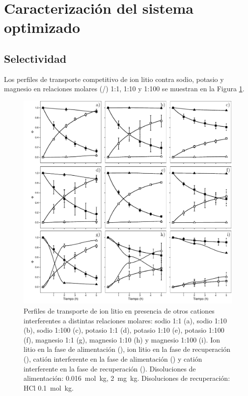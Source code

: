 \section{Caracterización del sistema optimizado}
\subsection{Selectividad}\label{sec:selecresults}
Los perfiles de transporte competitivo de ion litio contra sodio, potasio y magnesio en relaciones molares (/) 1:1, 1:10 y 1:100 se muestran en la Figura \ref{fig:selectivity1}.

\begin{figure}[H]
    \centering
    \includegraphics[width=\textwidth]{chap5/figures/thesis-selectividad.pdf}
    \caption[Perfiles de transporte competitivo de ion litio contra sodio, potasio y magnesio.]{Perfiles de transporte de ion litio en presencia de otros cationes interferentes a distintas relaciones molares: sodio 1:1 (a), sodio 1:10 (b), sodio 1:100 (c), potasio 1:1 (d), potasio 1:10 (e), potasio 1:100 (f), magnesio 1:1 (g),  magnesio 1:10 (h) y magnesio 1:100 (i). Ion litio en la fase de alimentación (\protect\squareblck), ion litio en la fase de recuperación (\protect\squarewht), catión interferente en la fase de alimentación (\protect\triangleupblck) y catión interferente en la fase de recuperación (\protect\triangleupwht). Disoluciones de alimentación:  0.016~mol~kg\mnn,  2~mg~kg\mnn. Disoluciones de recuperación: HCl 0.1~mol~kg\mnn.}
    \label{fig:selectivity1}
\end{figure}

